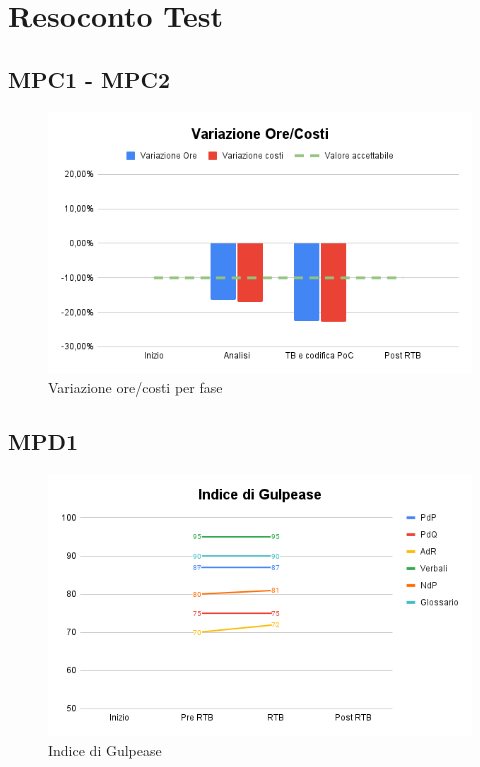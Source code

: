 \newpage
\section{Resoconto Test}
\subsection{MPC1 - MPC2}
\begin{figure}[h!]
    \centering
    \includegraphics[scale=0.65]{../../assets/Variazione_ore-costi.png}
    \caption{Variazione ore/costi per fase}
\end{figure}

\subsection{MPD1}
\begin{figure}[h!]
    \centering
    \includegraphics[scale=0.62]{../../assets/Indice di Gulpease.png}
    \caption{Indice di Gulpease}
\end{figure}
\newpage
